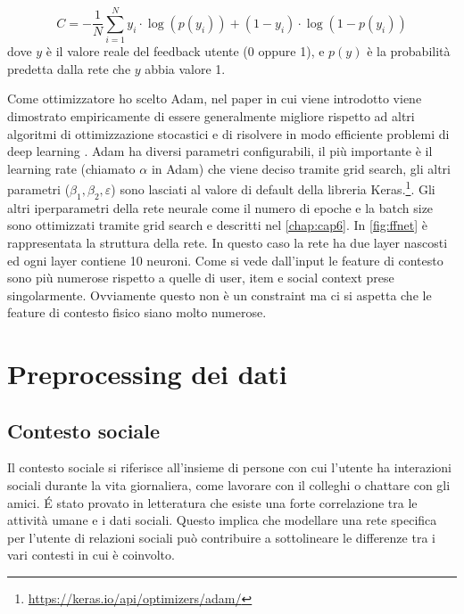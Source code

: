 \documentclass[12pt,italian]{report}
\begin{document}
$$
C = -\frac{1}{N} \sum_{i=1}^N y_i \cdot \log(p(y_i)) + (1-y_i) \cdot \log(1-p(y_i))
$$
dove $y$ è il valore reale del feedback utente (0 oppure 1), e $p(y)$ è la probabilità predetta dalla rete che $y$ abbia valore 1.

Come ottimizzatore ho scelto Adam, nel paper in cui viene introdotto viene dimostrato empiricamente di essere generalmente migliore rispetto ad altri algoritmi di ottimizzazione stocastici e di risolvere in modo efficiente problemi di deep learning \cite{adam}. Adam ha diversi parametri configurabili, il più importante è il learning rate (chiamato $\alpha$ in Adam) che viene deciso tramite grid search, gli altri parametri ($\beta_1, \beta_2, \varepsilon$) sono lasciati al valore di default della libreria Keras.\footnote{\url{https://keras.io/api/optimizers/adam/}}. Gli altri iperparametri della rete neurale come il numero di epoche e la batch size sono ottimizzati tramite grid search e descritti nel \autoref{chap:cap6}.
In \autoref{fig:ffnet} è rappresentata la struttura della rete. In questo caso la rete ha due layer nascosti ed ogni layer contiene 10 neuroni. Come si vede dall'input le feature di contesto sono più numerose rispetto a quelle di user, item e social context prese singolarmente. Ovviamente questo non è un constraint ma ci si aspetta che le feature di contesto fisico siano molto numerose.


\section{Preprocessing dei dati}
\subsection{Contesto sociale}
Il contesto sociale si riferisce all'insieme di persone con cui l'utente ha interazioni sociali durante la vita giornaliera, come lavorare con il colleghi o chattare con gli amici. \'E stato provato in letteratura che esiste una forte correlazione tra le attività umane e i dati sociali. Questo implica che modellare una rete specifica per l'utente di relazioni sociali può contribuire a sottolineare le differenze tra i vari contesti in cui è coinvolto.
\end{document}
